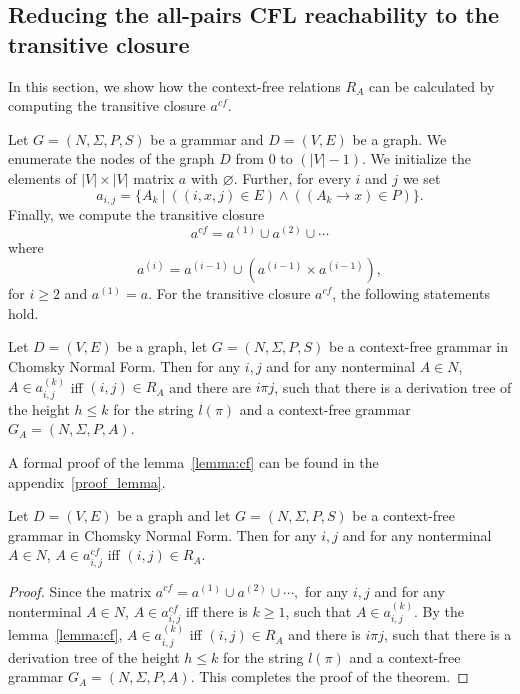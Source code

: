 \documentclass[runningheads,a4paper]{llncs}
\begin{document}
\subsection{Reducing the all-pairs CFL reachability to the transitive closure} \label{section_reducing}
In this section, we show how the context-free relations $R_A$ can be calculated by computing the transitive closure $a^{cf}$.

Let $G = (N,\Sigma,P,S)$ be a grammar and $D = (V, E)$ be a graph. We enumerate the nodes of the graph $D$ from 0 to $(|V| - 1)$. We initialize the elements of $|V| \times |V|$ matrix $a$ with $\varnothing$. Further, for every $i$ and $j$ we set $$a_{i,j} = \{A_k~|~((i,x,j) \in E) \wedge ((A_k \rightarrow x) \in P)\}.$$ Finally, we compute the transitive closure $$a^{cf} = a^{(1)} \cup a^{(2)} \cup \cdots$$ where $$a^{(i)} = a^{(i-1)} \cup (a^{(i-1)} \times a^{(i-1)}),$$ for $i \ge 2$ and $a^{(1)} = a$. For the transitive closure $a^{cf}$, the following statements hold.

\begin{lemma}\label{lemma:cf}
	Let $D = (V,E)$ be a graph, let $G =(N,\Sigma,P,S)$ be a context-free grammar in Chomsky Normal Form. Then for any $i, j$ and for any nonterminal $A \in N$, $A \in a^{(k)}_{i,j}$ iff $(i,j) \in R_A$ and there are $i \pi j$, such that there is a derivation tree of the height $h \leq k$ for the string $l(\pi)$ and a context-free grammar $G_A = (N,\Sigma,P,A)$.
\end{lemma}

A formal proof of the lemma~\ref{lemma:cf} can be found in the appendix~\ref{proof_lemma}.

\begin{mytheorem}\label{thm:correct}
	Let $D = (V,E)$ be a graph and let $G =(N,\Sigma,P,S)$ be a context-free grammar in Chomsky Normal Form. Then for any $i, j$ and for any nonterminal $A \in N$, $A \in a^{cf}_{i,j}$ iff $(i,j) \in R_A$.
\end{mytheorem}
\begin{proof}
	
	Since the matrix $a^{cf} = a^{(1)} \cup a^{(2)} \cup \cdots,$ for any $i, j$ and for any nonterminal $A \in N$, $A \in a^{cf}_{i,j}$ iff there is $k \geq 1$, such that $A \in a^{(k)}_{i,j}$. By the lemma~\ref{lemma:cf}, $A \in a^{(k)}_{i,j}$ iff $(i,j) \in R_A$ and there is $i \pi j$, such that there is a derivation tree of the height $h \leq k$ for the string $l(\pi)$ and a context-free grammar $G_A = (N,\Sigma,P,A)$. This completes the proof of the theorem.
\end{proof}
\end{document}
